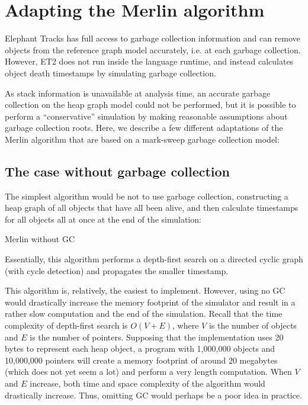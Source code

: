 \section{Adapting the Merlin algorithm}
Elephant Tracks has full access to garbage collection information and can remove objects from the reference graph model accurately, i.e. at each garbage
collection. However, ET2 does not run inside the language runtime, and instead calculates object death timestamps by simulating garbage collection.

As stack information is unavailable at analysis time, an accurate garbage collection on the heap graph model could not be performed, but it is possible
to perform a ``conservative'' simulation by making reasonable assumptions about garbage collection roots. Here, we describe a few different adaptations
of the Merlin algorithm that are based on a mark-sweep garbage collection model:

\subsection{The case without garbage collection}
The simplest algorithm would be not to use garbage collection, constructing a heap graph of all objects that have all been alive, and then calculate timestamps
for all objects all at once at the end of the simulation:

\begin{algorithm}[H]
  \caption{Merlin without GC}
\end{algorithm}

Essentially, this algorithm performs a depth-first search on a directed cyclic graph (with cycle detection) and propagates the smaller timestamp.

This algorithm is, relatively, the easiest to implement. However, using no GC would drastically increase the memory footprint of the simulator and result in
a rather slow computation and the end of the simulation. Recall that the time complexity of depth-first search is $O(V + E)$, where $V$ is the number of
objects and $E$ is the number of pointers. Supposing that the implementation uses 20 bytes to represent each heap object, a program with 1,000,000 objects
and 10,000,000 pointers will create a memory footprint of around 20 megabytes (which does not yet seem a lot) and perform a very length computation. When
$V$ and $E$ increase, both time and space complexity of the algorithm would drastically increase. Thus, omitting GC would perhaps be a poor idea in practice.

